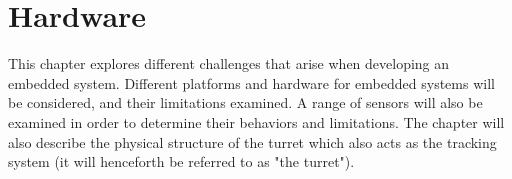 \chapter{Hardware}\label{ch:hardware}\label{\automlabel}
This chapter explores different challenges that arise when developing an embedded system. Different platforms and hardware for embedded systems will be considered, and their limitations examined. A range of sensors will also be examined in order to determine their behaviors and limitations. The chapter will also describe the physical structure of the turret which also acts as the tracking system (it will henceforth be referred to as "the turret"). 
\eal





